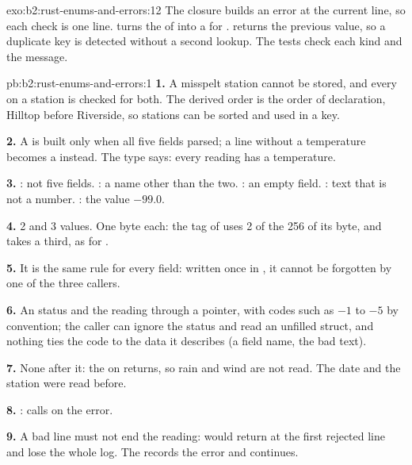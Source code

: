 \begin{solution}{exo:b2:rust-enums-and-errors:12}
The closure  builds an error at the current line, so each check is one line.  turns the
 of  into a  for .  returns the previous value, so a
duplicate key is detected without a second lookup. The tests check each kind and the  message.
\end{solution}

\begin{solution}{pb:b2:rust-enums-and-errors:1}
\textbf{1.} A misspelt station cannot be stored, and every  on a station is checked for both. The
derived order is the order of declaration, Hilltop before Riverside, so stations can be sorted and used in a
 key.

\textbf{2.} A  is built only when all five fields parsed; a line without a temperature becomes a
 instead. The type says: every reading has a temperature.

\textbf{3.} : not five fields. : a name other than the two. :
an empty field. : text that is not a number. : the value $-99.0$.

\textbf{4.} 2 and 3 values. One byte each: the tag of  uses 2 of the 256  of its byte, and
 takes a third, as for .

\textbf{5.} It is the same rule for every field: written once in , it cannot be forgotten by one of the
three callers.

\textbf{6.} An  status and the reading through a pointer, with codes such as $-1$ to $-5$ by convention;
the caller can ignore the status and read an unfilled struct, and nothing ties the code to the data it describes
(a field name, the bad text).

\textbf{7.} None after it: the  on  returns, so rain and wind are not read. The date and the
station were read before.

\textbf{8.} :  calls  on the error.

\textbf{9.} A bad line must not end the reading:  would return at the first rejected line and lose the
whole log. The  records the error and continues.


\end{solution}
